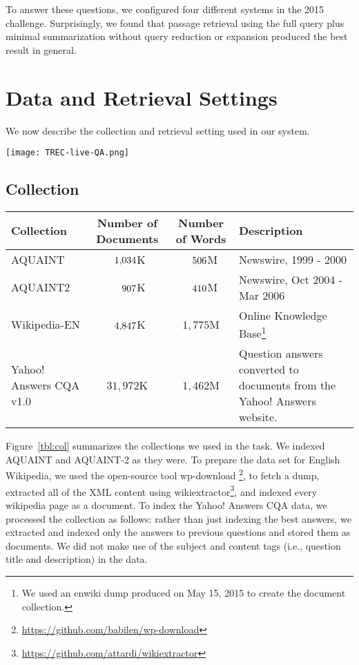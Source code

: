 \documentclass[a4paper,10pt,conference,compsocconf,final]{IEEEtran}
\newcommand\method[1]{{\sf\small{#1}}}
\def\D{\hphantom{1}}
\def\C{\hphantom{1,}}
\begin{document}
\bigskip

To answer these questions, we configured four different systems 
in the 2015 challenge.
Surprisingly, we found that passage retrieval using the full query
plus minimal summarization without query reduction or expansion
produced the best result in general.

\section{Data and Retrieval Settings}
We now describe the collection and retrieval setting used in our
system. 

\begin{figure*}
  \centering
  \texttt{[image: TREC-live-QA.png]}
\label{fig:arch}
   \caption{System architechture for each RMIT system. Green shading indicates components that are different when compared to RMIT-0.
}
\end{figure*}

\subsection{Collection}

\begin{table*}[!t]
\centering
\caption{Summary of collections indexed to answer questions.\label{tbl:col}}
\begin{tabular}{p{35mm}ccp{50mm}}
\toprule
{\bf Collection} & {\bf Number of Documents} & {\bf Number of Words} & {\bf Description} \\
\midrule
AQUAINT & $\D1{,}034$K & $\C506$M & Newswire, 1999 - 2000 \\
AQUAINT2 & $\D\C907$K & $\C410$M & Newswire, Oct 2004 - Mar 2006 \\
Wikipedia-EN & $\D4{,}847$K & $1{,}775$M & Online Knowledge Base\footnote{We used an enwiki dump produced on May 15, 2015 to create the document collection.} \\
Yahoo! Answers CQA v1.0 & $31{,}972$K & $1{,}462$M & Question answers converted to documents from the Yahoo! Answers website.
\\
\bottomrule
\end{tabular}
\end{table*}

Figure~{\ref{tbl:col}} summarizes the collections we used in the task.  We
indexed AQUAINT and AQUAINT-2 as they were.  To prepare the data set for
English Wikipedia, we used the open-source tool {\method{wp-download}}
\footnote{\url{https://github.com/babilen/wp-download}}, to fetch a dump, extracted
all of the XML content using
{\method{wikiextractor}}\footnote{\url{https://github.com/attardi/wikiextractor}},
and indexed every wikipedia page as a document.  To index the Yahoo!  Answers
CQA data, we processed the collection as follows: rather than just indexing the
best answers, we extracted and indexed only the answers to previous questions
and stored them as documents.  We did not make use of the subject and content
tags (i.e., question title and description) in the data.  
\end{document}
